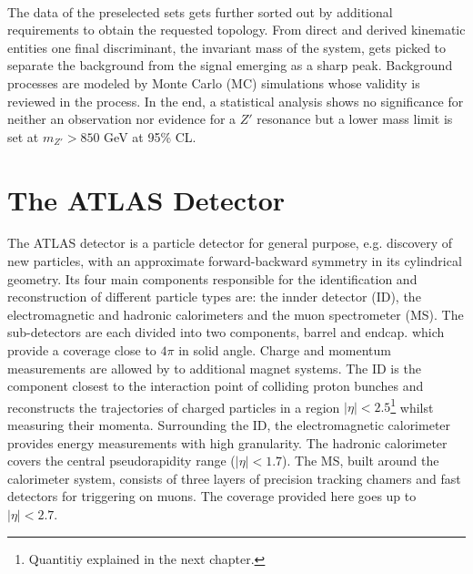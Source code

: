 \\
\noindent The data \cite{Atlas} of the preselected sets gets further sorted out by additional requirements to obtain the requested topology. From direct and 
derived kinematic entities one final discriminant, the invariant mass of the system, gets picked to separate the background from the signal emerging
as a sharp peak. Background processes are modeled by Monte Carlo (MC) simulations whose validity is reviewed in the process. In the end, a statistical
analysis shows no significance for neither an observation nor evidence for a $Z'$ resonance but a lower mass limit is set at $m_{Z'} >850$ GeV at 
95\% CL.


\FloatBarrier

\section{The ATLAS Detector}
The ATLAS detector \cite{Atlas} is a particle detector for general purpose, e.g. discovery of new particles,
with an approximate forward-backward symmetry in its cylindrical geometry. Its four main components responsible
for the identification and reconstruction of different particle types are: the innder detector (ID),
the electromagnetic and hadronic calorimeters and the muon spectrometer (MS). The sub-detectors
are each divided into two components, barrel and endcap. which provide a coverage close to $4\pi$ in
solid angle. Charge and momentum measurements are allowed by to additional magnet systems.
The ID is the component closest to the interaction point of colliding proton bunches and reconstructs
the trajectories of charged particles in a region $|\eta|<2.5$\footnote{Quantitiy explained in the next chapter.} whilst
measuring their momenta. Surrounding the ID, the electromagnetic calorimeter provides energy measurements with
high granularity. The hadronic calorimeter covers the central pseudorapidity range ($|\eta|<1.7$). The MS, built around 
the calorimeter system, consists of three layers of precision tracking chamers and fast detectors for triggering
on muons. The coverage provided here goes up to $|\eta|<2.7$.

